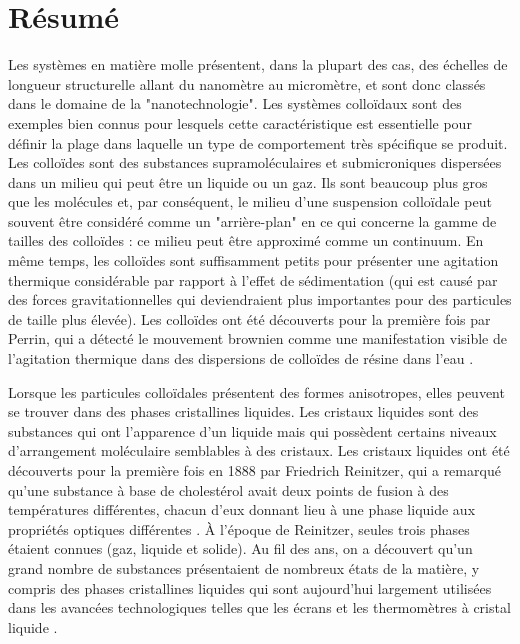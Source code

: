 

\chapter{Résumé}

Les systèmes en matière molle présentent, dans la plupart des cas, des échelles de longueur structurelle allant du nanomètre au micromètre, et sont donc classés dans le domaine de la "nanotechnologie". Les systèmes colloïdaux sont des exemples bien connus pour lesquels cette caractéristique est essentielle pour définir la plage dans laquelle un type de comportement très spécifique se produit. Les colloïdes sont des substances supramoléculaires et submicroniques dispersées dans un milieu qui peut être un liquide ou un gaz. Ils sont beaucoup plus gros que les molécules et, par conséquent, le milieu d'une suspension colloïdale peut souvent être considéré comme un "arrière-plan" en ce qui concerne la gamme de tailles des colloïdes : ce milieu peut être approximé comme un continuum. En même temps, les colloïdes sont suffisamment petits pour présenter une agitation thermique considérable par rapport à l'effet de sédimentation (qui est causé par des forces gravitationnelles qui deviendraient plus importantes pour des particules de taille plus élevée). Les colloïdes ont été découverts pour la première fois par Perrin, qui a détecté le mouvement brownien comme une manifestation visible de l'agitation thermique dans des dispersions de colloïdes de résine dans l'eau \cite{perrin1913atomes}.

Lorsque les particules colloïdales présentent des formes anisotropes, elles peuvent se trouver dans des phases cristallines liquides. Les cristaux liquides sont des substances qui ont l'apparence d'un liquide mais qui possèdent certains niveaux d'arrangement moléculaire semblables à des cristaux. Les cristaux liquides ont été découverts pour la première fois en 1888 par Friedrich Reinitzer, qui a remarqué qu'une substance à base de cholestérol avait deux points de fusion à des températures différentes, chacun d'eux donnant lieu à une phase liquide aux propriétés optiques différentes \cite{reinitzer1888beitrage}. À l'époque de Reinitzer, seules trois phases étaient connues (gaz, liquide et solide). Au fil des ans, on a découvert qu'un grand nombre de substances présentaient de nombreux états de la matière, y compris des phases cristallines liquides qui sont aujourd'hui largement utilisées dans les avancées technologiques telles que les écrans et les thermomètres à cristal liquide \cite{Li_2012}.

